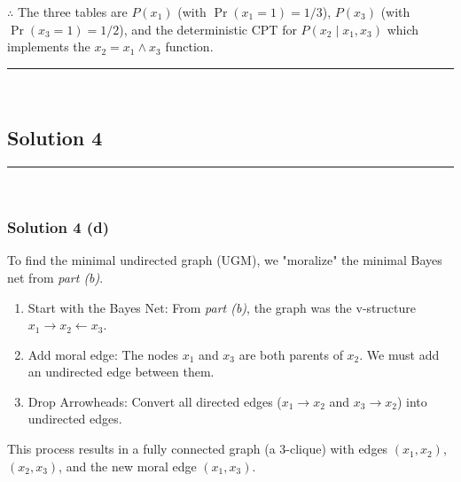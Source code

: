 \documentclass{article}
\begin{document}
\subsubsection*{\normalfont}{$\therefore$ The three tables are $P(x_1)$ (with $\Pr(x_1=1)=1/3$), $P(x_3)$ (with $\Pr(x_3=1)=1/2$), and the deterministic CPT for $P(x_2 \mid x_1, x_3)$ which implements the $x_2 = x_1 \land x_3$ function.}

\noindent\rule{\textwidth}{0.4pt}\\

\newpage

\subsection*{Solution 4}
\noindent\rule{\textwidth}{0.4pt}\\
\subsubsection*{Solution 4 (d)}
To find the minimal undirected graph (UGM), we "moralize" the minimal Bayes net from \textit{part (b)}.

\begin{enumerate}
    \item Start with the Bayes Net: From \textit{part (b)}, the graph was the v-structure $x_1 \to x_2 \leftarrow x_3$.

    \item Add moral edge: The nodes $x_1$ and $x_3$ are both parents of $x_2$. We must add an undirected edge between them.

    \item Drop Arrowheads: Convert all directed edges ($x_1 \to x_2$ and $x_3 \to x_2$) into undirected edges.
\end{enumerate}
\begin{flushleft}
    This process results in a fully connected graph (a 3-clique) with edges $(x_1, x_2)$, $(x_2, x_3)$, and the new moral edge $(x_1, x_3)$.
\end{flushleft}

\begin{center}
\end{center}
\end{document}
